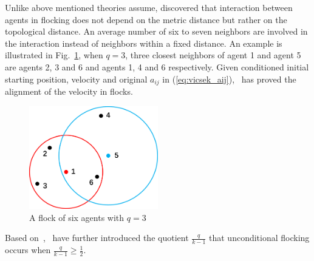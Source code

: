 Unlike above mentioned theories assume, \cite{PNAS} discovered that interaction between agents in flocking does not depend on the metric distance but rather on the topological distance. An average number of six to seven neighbors are involved in the interaction instead of neighbors within a fixed distance. An example is illustrated in Fig.~\ref{fig:knn}, when $q=3$, three closest neighbors of agent 1 and agent 5 are agents 2, 3 and 6 and agents 1, 4 and 6 respectively. Given conditioned initial starting position, velocity and original $a_{ij}$ in (\ref{eq:vicsek_aij}),~\cite{KNN} has proved the alignment of the velocity in flocks.

\begin{figure}[htb]
  \centering
  \includegraphics[width=0.5\textwidth]{figure/chapter_2/knn.png}
  \caption{A flock of six agents with $q=3$}
  \label{fig:knn}
\end{figure}

\noindent
Based on~\cite{KNN},~\cite{CuckerDong2016} have further introduced the quotient $\frac{q}{k-1}$ that unconditional flocking occurs when $\frac{q}{k-1}\geq\frac{1}{2}$.

\newpage
